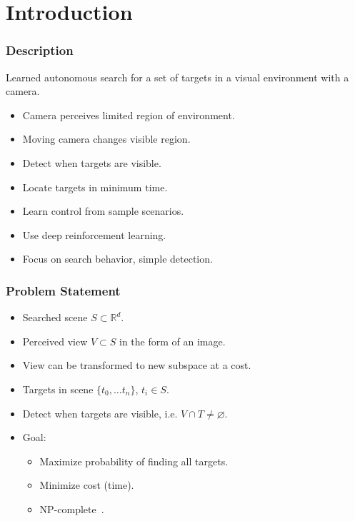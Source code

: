
\section{Introduction}

\begin{frame}
    \frametitle{Description}
    
    Learned autonomous search for a set of targets in a visual environment with a camera.

    \begin{itemize}
        \item Camera perceives limited region of environment.
        \item Moving camera changes visible region.
        \item Detect when targets are visible.
        \item Locate targets in minimum time.
        \item Learn control from sample scenarios.
        \item Use deep reinforcement learning.
        \item Focus on search behavior, simple detection.
    \end{itemize}
\end{frame}

\begin{frame}
    \frametitle{Problem Statement}

    \begin{itemize}
        \item Searched scene \(S \subset \mathbb{R}^d\).
        \item Perceived view \(V \subset S\) in the form of an image.
        \item View can be transformed to new subspace at a cost.
        \item Targets in scene \(\{t_0, \dots t_n\}\), \(t_i \in S\).
        \item Detect when targets are visible, i.e. \(V \cap T \neq \varnothing\). 
        \item Goal:
        \begin{itemize}
            \item Maximize probability of finding all targets.
            \item Minimize cost (time).
            \item NP-complete~\cite{andreopoulos_theory_2009}. %
        \end{itemize}
    \end{itemize}
\end{frame}

